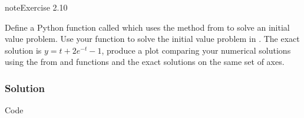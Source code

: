 \documentclass[letterpaper,10pt,english]{jupyterBook}
\begin{document}
\begin{sphinxadmonition}{note}{Exercise 2.10}

\sphinxAtStartPar
Define a Python function called  which uses the method from {\hyperref[\detokenize{2_ERKs/2.5_ERK_Exercises:ex2-5}]{}} to solve an initial value problem. Use your function to solve the initial value problem in {\hyperref[\detokenize{2_ERKs/2.5_ERK_Exercises:ex2-6}]{}}. The exact solution is \(y = t + 2e^{-t} - 1\), produce a plot comparing your numerical solutions using the  from {\hyperref[\detokenize{2_ERKs/2.5_ERK_Exercises:ex2-7}]{}} and  functions and the exact solutions on the same set of axes.
\subsubsection*{Solution}

\sphinxAtStartPar
Code

\begin{sphinxVerbatim}[commandchars=\\\{\}]
   
   


\end{sphinxVerbatim}
\end{sphinxadmonition}
\end{document}
